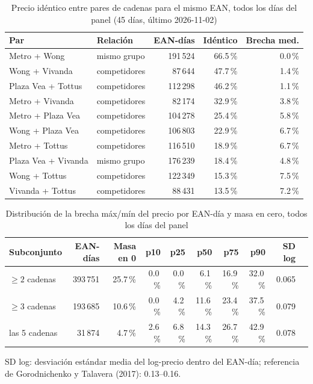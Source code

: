 
\begin{table}[htbp]
\caption{Precio id\'entico entre pares de cadenas para el mismo EAN, todos los d\'ias del panel (45 d\'ias, \'ultimo 2026-11-02)}
\label{tab:identidad}
\centering\scriptsize\setlength{\tabcolsep}{3pt}
\begin{tabular}{@{}llrrr@{}}
\toprule
Par & Relaci\'on & EAN-d\'ias & Id\'entico & Brecha med. \\
\midrule
Metro + Wong & mismo grupo & 191\,524 & 66.5\,\% & 0.0\,\% \\
Wong + Vivanda & competidores & 87\,644 & 47.7\,\% & 1.4\,\% \\
Plaza Vea + Tottus & competidores & 112\,298 & 46.2\,\% & 1.1\,\% \\
Metro + Vivanda & competidores & 82\,174 & 32.9\,\% & 3.8\,\% \\
Metro + Plaza Vea & competidores & 104\,278 & 25.4\,\% & 5.8\,\% \\
Wong + Plaza Vea & competidores & 106\,803 & 22.9\,\% & 6.7\,\% \\
Metro + Tottus & competidores & 116\,510 & 18.9\,\% & 6.7\,\% \\
Plaza Vea + Vivanda & mismo grupo & 176\,239 & 18.4\,\% & 4.8\,\% \\
Wong + Tottus & competidores & 122\,349 & 15.3\,\% & 7.5\,\% \\
Vivanda + Tottus & competidores & 88\,431 & 13.5\,\% & 7.2\,\% \\
\bottomrule\end{tabular}\end{table}

\begin{table}[t]
\caption{Distribuci\'on de la brecha m\'ax/m\'in del precio por EAN-d\'ia y masa en cero, todos los d\'ias del panel}
\label{tab:brecha}
\centering\scriptsize\setlength{\tabcolsep}{4pt}
\begin{tabular}{@{}lrrrrrrrrr@{}}
\toprule
Subconjunto & EAN-d\'ias & Masa en 0 & p10 & p25 & p50 & p75 & p90 & SD log \\
\midrule
$\geq 2$ cadenas & 393\,751 & 25.7\,\% & 0.0\,\% & 0.0\,\% & 6.1\,\% & 16.9\,\% & 32.0\,\% & 0.065 \\
$\geq 3$ cadenas & 193\,685 & 10.6\,\% & 0.0\,\% & 4.2\,\% & 11.6\,\% & 23.4\,\% & 37.5\,\% & 0.079 \\
las 5 cadenas & 31\,874 & 4.7\,\% & 2.6\,\% & 6.8\,\% & 14.3\,\% & 26.7\,\% & 42.9\,\% & 0.078 \\
\bottomrule\end{tabular}
\par\smallskip\raggedright\scriptsize SD log: desviaci\'on est\'andar media del log-precio dentro del EAN-d\'ia; referencia de Gorodnichenko y Talavera (2017): 0.13--0.16.
\end{table}

